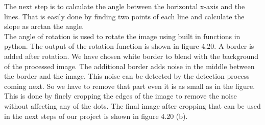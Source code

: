 \newpage


 The next step is to calculate the angle between the horizontal x-axis and the lines. That is easily done by finding two points of each line and calculate the slope as arctan the angle. \\



The angle of rotation is used to rotate the image using built in functions in python. The output of the rotation function is shown in figure 4.20. A border is added after rotation. We have chosen white border to blend with the background of the processed image. The additional border adds noise in the middle between the border and the image. This noise can be detected by the detection process coming next. So we have to remove that part even it is as small as in the figure. This is done by finely cropping the edges of the image to remove the noise without affecting any of the dots. The final image after cropping that can be used in the next steps of our project is shown in figure 4.20 (b). \\

